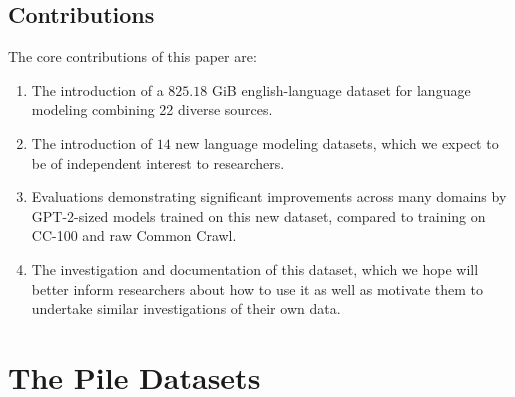 \documentclass[11pt,a4paper]{article}
\begin{document}
\subsection{Contributions}

The core contributions of this paper are:

\begin{enumerate}
    \item The introduction of a $825.18$ GiB english-language dataset for language modeling combining 22 diverse sources. 
    \item The introduction of $14$ new language modeling datasets, which we expect to be of independent interest to researchers.
    \item Evaluations demonstrating significant improvements across many domains by GPT-2-sized models trained on this new dataset, compared to training on CC-100 and raw Common Crawl.
    \item The investigation and documentation of this dataset, which we hope will better inform researchers about how to use it as well as motivate them to undertake similar investigations of their own data.
\end{enumerate}

\section{The Pile Datasets}\label{sec:data}
\end{document}
